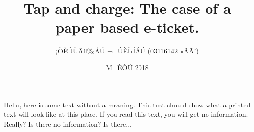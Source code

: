 \documentclass[11pt]{article}
\title{ Tap and charge: The case of a paper based e-ticket. }
\author{¡ÒÈÛÙÂﬂ‰ÁÚ ¬·ÛÈÎ‹ÍÁÚ (03116142-«ÃÃ’)}
\date{M·ÈÔÚ 2018}
\begin{document}
\maketitle
\begin{multicols}{2}

Hello, here is some text without a meaning.  This text should show what 
a printed text will look like at this place.
If you read this text, you will get no information.  Really?  Is there 
no information?  Is there...

\end{multicols}
\end{document}

